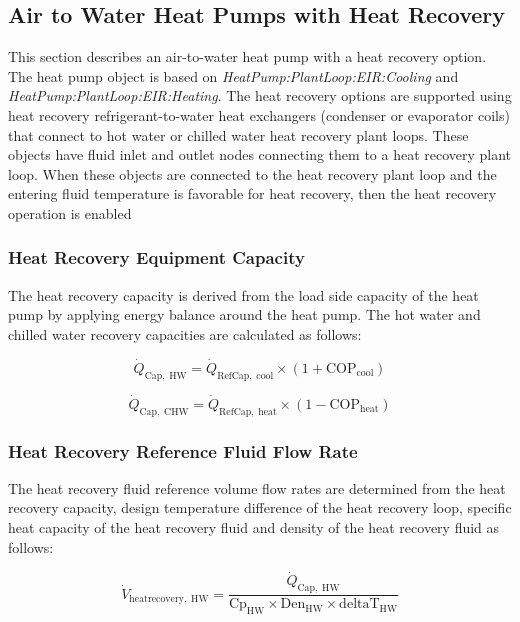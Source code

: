 \subsection{Air to Water Heat Pumps with Heat Recovery}\label{air-to-water-heat-pumps-with-heat-recovery}

This section describes an air-to-water heat pump with a heat recovery option. The heat pump object is based on \textit{HeatPump:PlantLoop:EIR:Cooling} and \textit{HeatPump:PlantLoop:EIR:Heating}. The heat recovery options are supported using heat recovery refrigerant-to-water heat exchangers (condenser or evaporator coils) that connect to hot water or chilled water heat recovery plant loops. These objects have fluid inlet and outlet nodes connecting them to a heat recovery plant loop. When these objects are connected to the heat recovery plant loop and the entering fluid temperature is favorable for heat recovery, then the heat recovery operation is enabled

\subsubsection{Heat Recovery Equipment Capacity}
The heat recovery capacity is derived from the load side capacity of the heat pump by applying energy balance around the heat pump. The hot water and chilled water recovery capacities are calculated as follows:

\begin{equation}
\dot{Q}_\mathrm{Cap,\; HW} = \dot{Q}_\mathrm{RefCap,\; cool} \times \mathrm{(1 + COP_\mathrm{cool})}
\end{equation}

\begin{equation}
\dot{Q}_\mathrm{Cap,\; CHW} = \dot{Q}_\mathrm{RefCap,\; heat} \times \mathrm{(1 - COP_\mathrm{heat})}
\end{equation}

\subsubsection{Heat Recovery Reference Fluid Flow Rate}
The heat recovery fluid reference volume flow rates are determined from the heat recovery capacity, design temperature difference of the heat recovery loop, specific heat capacity of the heat recovery fluid and density of the heat recovery fluid as follows:

\begin{equation}
\dot{V}_\mathrm{heatrecovery,\; HW} = \frac{\dot{Q}_\mathrm{Cap,\; HW}}{\mathrm{Cp}_\mathrm{HW} \times \mathrm{Den}_\mathrm{HW} \times \mathrm{deltaT}_\mathrm{HW}}
\end{equation}

